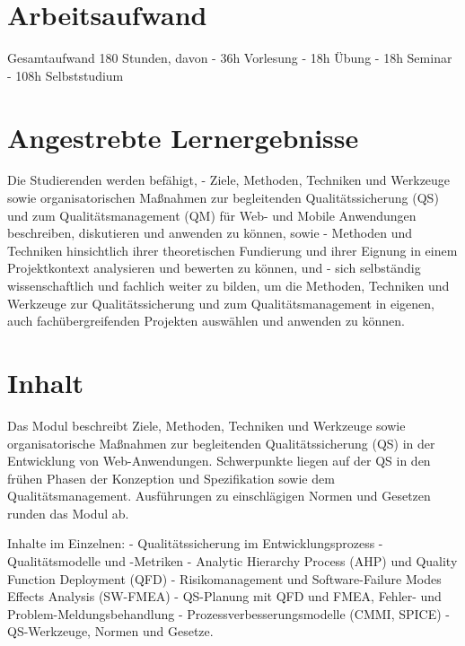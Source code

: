 \section*{Arbeitsaufwand
\label{/mi-2017/modulbeschreibungen-master/MA_WTW_Modul_QUS_Winter}}\label{arbeitsaufwand-pathlabelmi-2017modulbeschreibungen-mastermaux5fwtwux5fmodulux5fqusux5fwinter}

Gesamtaufwand 180 Stunden, davon - 36h Vorlesung - 18h Übung - 18h
Seminar - 108h Selbststudium

\section*{Angestrebte
Lernergebnisse\label{/mi-2017/modulbeschreibungen-master/MA_WTW_Modul_QUS_Winter}}\label{angestrebte-lernergebnissepathlabelmi-2017modulbeschreibungen-mastermaux5fwtwux5fmodulux5fqusux5fwinter}

Die Studierenden werden befähigt, - Ziele, Methoden, Techniken und
Werkzeuge sowie organisatorischen Maßnahmen zur begleitenden
Qualitätssicherung (QS) und zum Qualitätsmanagement (QM) für Web- und
Mobile Anwendungen beschreiben, diskutieren und anwenden zu können,
sowie - Methoden und Techniken hinsichtlich ihrer theoretischen
Fundierung und ihrer Eignung in einem Projektkontext analysieren und
bewerten zu können, und - sich selbständig wissenschaftlich und fachlich
weiter zu bilden, um die Methoden, Techniken und Werkzeuge zur
Qualitätssicherung und zum Qualitätsmanagement in eigenen, auch
fachübergreifenden Projekten auswählen und anwenden zu können.

\section*{Inhalt\label{/mi-2017/modulbeschreibungen-master/MA_WTW_Modul_QUS_Winter}}\label{inhaltpathlabelmi-2017modulbeschreibungen-mastermaux5fwtwux5fmodulux5fqusux5fwinter}

Das Modul beschreibt Ziele, Methoden, Techniken und Werkzeuge sowie
organisatorische Maßnahmen zur begleitenden Qualitätssicherung (QS) in
der Entwicklung von Web-Anwendungen. Schwerpunkte liegen auf der QS in
den frühen Phasen der Konzeption und Spezifikation sowie dem
Qualitätsmanagement. Ausführungen zu einschlägigen Normen und Gesetzen
runden das Modul ab.

Inhalte im Einzelnen: - Qualitätssicherung im Entwicklungsprozess -
Qualitätsmodelle und -Metriken - Analytic Hierarchy Process (AHP) und
Quality Function Deployment (QFD) - Risikomanagement und
Software-Failure Modes Effects Analysis (SW-FMEA) - QS-Planung mit QFD
und FMEA, Fehler- und Problem-Meldungsbehandlung -
Prozessverbesserungsmodelle (CMMI, SPICE) - QS-Werkzeuge, Normen und
Gesetze.

